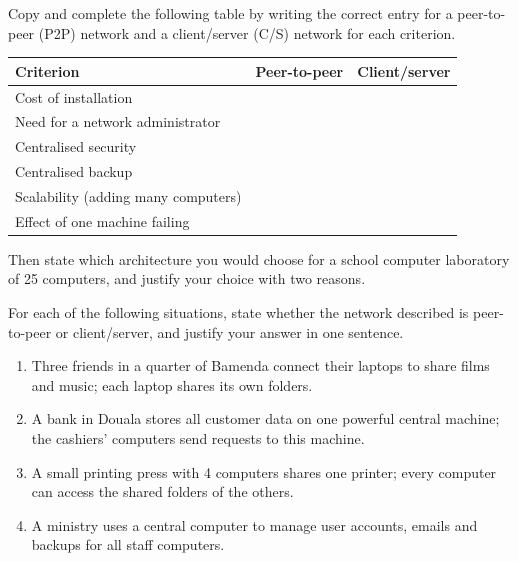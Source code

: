 \documentclass[11pt]{article}
\newcounter{popsec}
\newcounter{popsub}
\newcommand{\courssub}[1]{%
  \stepcounter{popsub}%
  \par\vspace{9pt}\noindent{\popxbold\fontsize{11.5}{13}\selectfont\color{popink}{\color{poporange}\thepopsec.\thepopsub}\hspace{6pt}#1}\par\nopagebreak\vspace{4pt}
}
\begin{document}
\courssub{I practise}

\begin{exercice}
Copy and complete the following table by writing the correct entry for a peer-to-peer (P2P) network and a client/server (C/S) network for each criterion.

\begin{center}
\begin{tabularx}{\linewidth}{|l|X|X|}
\hline
\rowcolor{popblueL} \textbf{Criterion} & \textbf{Peer-to-peer} & \textbf{Client/server} \\
\hline
Cost of installation & & \\
\hline
Need for a network administrator & & \\
\hline
Centralised security & & \\
\hline
Centralised backup & & \\
\hline
Scalability (adding many computers) & & \\
\hline
Effect of one machine failing & & \\
\hline
\end{tabularx}
\end{center}

Then state which architecture you would choose for a school computer laboratory of 25 computers, and justify your choice with two reasons.
\end{exercice}

\begin{exercice}
For each of the following situations, state whether the network described is peer-to-peer or client/server, and justify your answer in one sentence.
\begin{enumerate}
\item Three friends in a quarter of Bamenda connect their laptops to share films and music; each laptop shares its own folders.
\item A bank in Douala stores all customer data on one powerful central machine; the cashiers' computers send requests to this machine.
\item A small printing press with 4 computers shares one printer; every computer can access the shared folders of the others.
\item A ministry uses a central computer to manage user accounts, emails and backups for all staff computers.
\end{enumerate}
\end{exercice}
\end{document}
